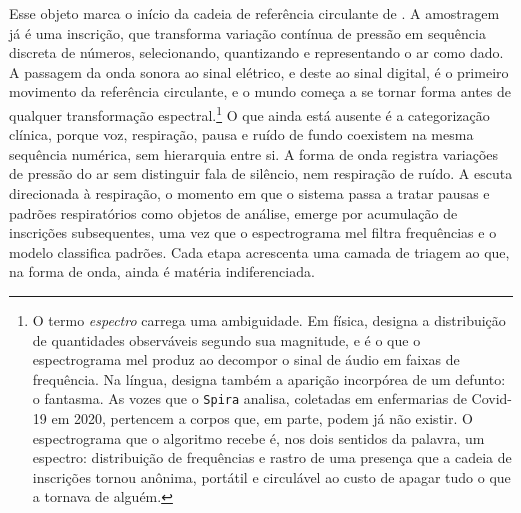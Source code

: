 Esse objeto marca o início da cadeia de referência circulante de \textcite{Latour2017Esperanca}. A amostragem já é uma inscrição, que transforma variação contínua de pressão em sequência discreta de números, selecionando, quantizando e representando o ar como dado. A passagem da onda sonora ao sinal elétrico, e deste ao sinal digital, é o primeiro movimento da referência circulante, e o mundo começa a se tornar forma antes de qualquer transformação espectral.\footnote{O termo \textit{espectro} carrega uma ambiguidade. Em física, designa a distribuição de quantidades observáveis segundo sua magnitude, e é o que o espectrograma mel produz ao decompor o sinal de áudio em faixas de frequência. Na língua, designa também a aparição incorpórea de um defunto: o fantasma. As vozes que o \texttt{Spira} analisa, coletadas em enfermarias de Covid-19 em 2020, pertencem a corpos que, em parte, podem já não existir. O espectrograma que o algoritmo recebe é, nos dois sentidos da palavra, um espectro: distribuição de frequências e rastro de uma presença que a cadeia de inscrições tornou anônima, portátil e circulável ao custo de apagar tudo o que a tornava de alguém.} O que ainda está ausente é a categorização clínica, porque voz, respiração, pausa e ruído de fundo coexistem na mesma sequência numérica, sem hierarquia entre si. A forma de onda registra variações de pressão do ar sem distinguir fala de silêncio, nem respiração de ruído. A escuta direcionada à respiração, o momento em que o sistema passa a tratar pausas e padrões respiratórios como objetos de análise, emerge por acumulação de inscrições subsequentes, uma vez que o espectrograma mel filtra frequências e o modelo classifica padrões. Cada etapa acrescenta uma camada de triagem ao que, na forma de onda, ainda é matéria indiferenciada.

